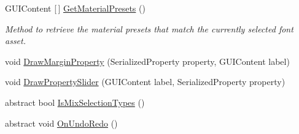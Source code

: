 \begin{DoxyCompactItemize}
G\+U\+I\+Content \mbox{[}$\,$\mbox{]} \mbox{\hyperlink{class_t_m_pro_1_1_editor_utilities_1_1_t_m_p___base_editor_panel_a5bd05f0804830e2188e5666bdfc2eef0}{Get\+Material\+Presets}} ()
\begin{DoxyCompactList}\small\item\em Method to retrieve the material presets that match the currently selected font asset. \end{DoxyCompactList}\item 
void \mbox{\hyperlink{class_t_m_pro_1_1_editor_utilities_1_1_t_m_p___base_editor_panel_af44c33a23c1dc0d7821d96be352c8d56}{Draw\+Margin\+Property}} (Serialized\+Property property, G\+U\+I\+Content label)
\item 
void \mbox{\hyperlink{class_t_m_pro_1_1_editor_utilities_1_1_t_m_p___base_editor_panel_af335a8544934d98010f47fafc0b5e5b3}{Draw\+Property\+Slider}} (G\+U\+I\+Content label, Serialized\+Property property)
\item 
abstract bool \mbox{\hyperlink{class_t_m_pro_1_1_editor_utilities_1_1_t_m_p___base_editor_panel_a2d01dae660062e1028c4b28f40689aa9}{Is\+Mix\+Selection\+Types}} ()
\item 
abstract void \mbox{\hyperlink{class_t_m_pro_1_1_editor_utilities_1_1_t_m_p___base_editor_panel_a03f1303365c95a93f4fae9cb11af7df7}{On\+Undo\+Redo}} ()
\end{DoxyCompactItemize}
